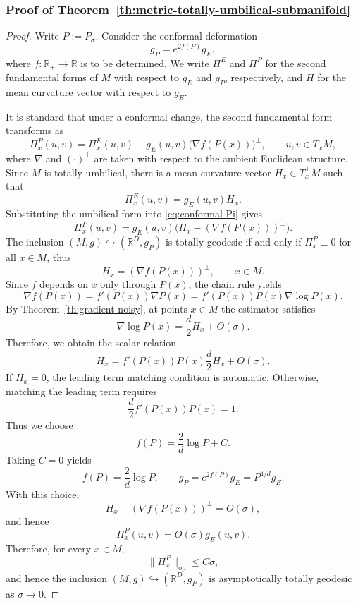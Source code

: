 \documentclass[11pt]{article}
\theoremstyle{plain}
\theoremstyle{definition}
\begin{document}
\subsubsection{Proof of Theorem~\ref{th:metric-totally-umbilical-submanifold}}\label{sec:pf-metric totally umbilical submanifold}
\begin{proof}
Write $P:=P_\sigma$. Consider the conformal deformation
\[
g_P = e^{2f(P)}g_E,
\]
where $f:\mathbb{R}_+\to\mathbb{R}$ is to be determined. We write $\Pi^{E}$ and $\Pi^{P}$ for the second fundamental forms of $M$ with respect to $g_E$ and $g_P$, respectively, and $H$ for the mean curvature vector with respect to $g_E$.

It is standard that under a conformal change, the second fundamental form transforms as
\begin{equation}\label{eq:conformal-Pi}
\Pi^P_x(u,v)
=
\Pi^E_x(u,v)-g_E(u,v)\big(\nabla f(P(x))\big)^\perp,\qquad u,v\in T_xM,
\end{equation}
where $\nabla$ and $(\cdot)^\perp$ are taken with respect to the ambient Euclidean structure.
Since $M$ is totally umbilical, there is a mean curvature vector $H_x\in T_x^\perp M$ such that
\[
\Pi^E_x(u,v) = g_E(u,v)H_x.
\]
Substituting the umbilical form into \eqref{eq:conformal-Pi} gives
\[
\Pi^P_x(u,v)
=
g_E(u,v)\big(H_x - (\nabla f(P(x)))^\perp\big).
\]
The inclusion $(M,g)\hookrightarrow(\mathbb{R}^D,g_P)$ is totally geodesic if and only if $\Pi^P_x\equiv0$ for all $x\in M$, thus
\[
H_x = (\nabla f(P(x)))^\perp,\qquad x\in M.
\]
Since $f$ depends on $x$ only through $P(x)$, the chain rule yields
\[
\nabla f(P(x)) = f'(P(x))\nabla P(x) = f'(P(x))P(x)\nabla\log P(x).
\]
By Theorem~\ref{th:gradient-noisy}, at points $x\in M$ the estimator satisfies
\[
\nabla \log P(x)=\frac{d}{2}H_x + O(\sigma).
\]
Therefore, we obtain the scalar relation
\[
H_x
=
f'(P(x))P(x)\frac{d}{2}H_x + O(\sigma).
\]
If $H_x=0$, the leading term matching condition is automatic. Otherwise, matching the leading term requires
\[
\frac{d}{2}f'(P(x))P(x) = 1.
\]
Thus we choose 
\[
f(P)=\frac{2}{d}\log P + C.
\]
Taking $C=0$ yields
\[
f(P) = \frac{2}{d}\log P,
\qquad
g_P = e^{2f(P)}g_E = P^{4/d}g_E.
\]
With this choice,
\[
H_x-(\nabla f(P(x)))^\perp=O(\sigma),
\]
and hence
\[
\Pi^P_x(u,v)=O(\sigma)g_E(u,v).
\]
Therefore, for every $x\in M$,
\[
\|\Pi_x^{P}\|_{\mathrm{op}}\le C\sigma,
\]
and hence the inclusion $(M,g)\hookrightarrow (\mathbb{R}^D,g_P)$ is asymptotically totally geodesic as $\sigma\to 0$.
\end{proof}
\end{document}
